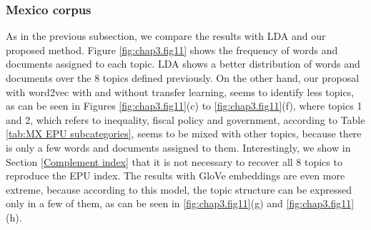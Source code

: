 \documentclass{article}
\begin{document}
\subsubsection{Mexico corpus}
\label{sec:topic_mxcorpus}

As in the previous subsection, we compare the results with LDA and our proposed method. Figure \ref{fig:chap3.fig11} shows the frequency of words and documents assigned to each topic. LDA shows a better distribution of words and documents over the 8 topics defined previously. On the other hand, our proposal with word2vec with and without transfer learning, seems to identify less topics, as can be seen in Figures \ref{fig:chap3.fig11}(c) to \ref{fig:chap3.fig11}(f), where topics 1 and 2, which refers to inequality, fiscal policy and government, according to Table \ref{tab:MX EPU subcategories}, seems to be mixed with other topics, because there is only a few words and documents assigned to them. Interestingly, we show in Section \ref{Complement index} that it is not necessary to recover all 8 topics to reproduce the EPU index. The results with GloVe embeddings are even more extreme, because according to this model, the topic structure can be expressed only in a few of them, as can be seen in \ref{fig:chap3.fig11}(g) and \ref{fig:chap3.fig11}(h).
\end{document}
